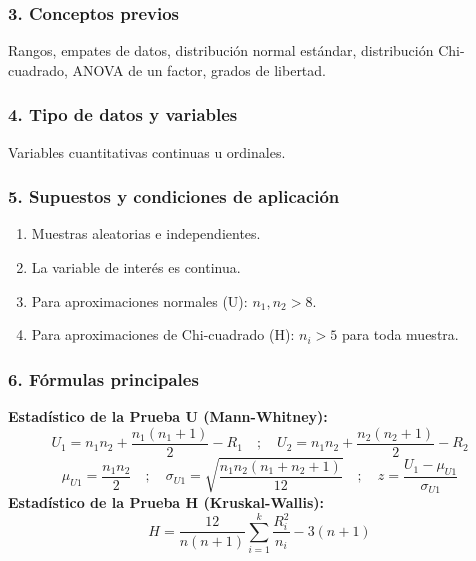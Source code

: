 \documentclass[11pt,a4paper]{article}
\begin{document}
\subsubsection{3. Conceptos previos}
Rangos, empates de datos, distribución normal estándar, distribución Chi-cuadrado, ANOVA de un factor, grados de libertad.

\subsubsection{4. Tipo de datos y variables}
Variables cuantitativas continuas u ordinales.

\subsubsection{5. Supuestos y condiciones de aplicación}
\begin{enumerate}
    \item Muestras aleatorias e independientes.
    \item La variable de interés es continua.
    \item Para aproximaciones normales (U): $n_1, n_2 > 8$.
    \item Para aproximaciones de Chi-cuadrado (H): $n_i > 5$ para toda muestra.
\end{enumerate}

\subsubsection{6. Fórmulas principales}
\begin{tcolorbox}[colback=yellow!5!white,colframe=yellow!60!black,title=Fórmulas de Suma de Rangos]
    \textbf{Estadístico de la Prueba U (Mann-Whitney):}
    \[ U_1 = n_1 n_2 + \frac{n_1(n_1+1)}{2} - R_1 \quad ; \quad U_2 = n_1 n_2 + \frac{n_2(n_2+1)}{2} - R_2 \]
    \[ \mu_{U1} = \frac{n_1 n_2}{2} \quad ; \quad \sigma_{U1} = \sqrt{\frac{n_1 n_2 (n_1 + n_2 + 1)}{12}} \quad ; \quad z = \frac{U_1 - \mu_{U1}}{\sigma_{U1}} \]
    \textbf{Estadístico de la Prueba H (Kruskal-Wallis):}
    \[ H = \frac{12}{n(n+1)} \sum_{i=1}^{k} \frac{R_i^2}{n_i} - 3(n+1) \]
\end{tcolorbox}
\end{document}
